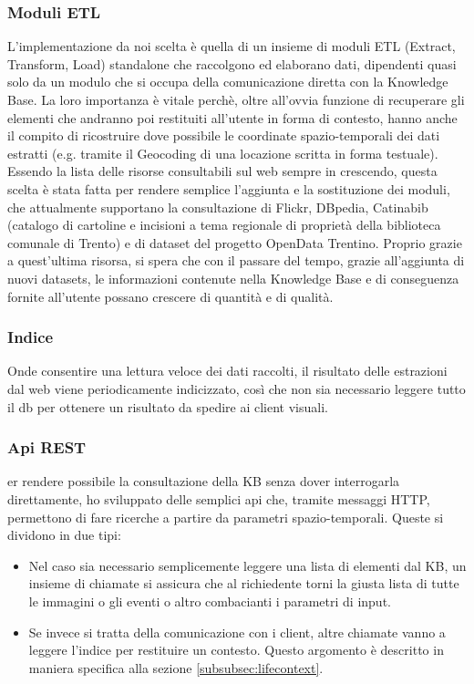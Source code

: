 \documentclass[sigproc-sp.tex]{subfiles}
\begin{document}
\subsubsection{Moduli ETL}
L’implementazione da noi scelta è quella di un insieme di moduli ETL (Extract, Transform, Load) standalone che raccolgono ed elaborano dati, dipendenti quasi solo da un modulo che si occupa della comunicazione diretta con la Knowledge Base. La loro importanza è vitale perchè, oltre all’ovvia funzione di recuperare gli elementi che andranno poi restituiti all’utente in forma di contesto, hanno anche il compito di ricostruire dove possibile le coordinate spazio-temporali dei dati estratti (e.g. tramite il Geocoding di una locazione scritta in forma testuale). Essendo la lista delle risorse consultabili sul web sempre in crescendo, questa scelta è stata fatta per rendere semplice l’aggiunta e la sostituzione dei moduli, che attualmente supportano la consultazione di Flickr, DBpedia, Catinabib (catalogo di cartoline e incisioni a tema regionale di proprietà della biblioteca comunale di Trento) e di dataset del progetto OpenData Trentino. Proprio grazie a quest’ultima risorsa, si spera che con il passare del tempo, grazie all’aggiunta di nuovi datasets, le informazioni contenute nella Knowledge Base e di conseguenza fornite all’utente possano crescere di quantità e di qualità.

\subsubsection{Indice}
Onde consentire una lettura veloce dei dati raccolti, il risultato delle estrazioni dal web viene periodicamente indicizzato, così che non sia necessario leggere tutto il db per ottenere un risultato da spedire ai client visuali.

\subsubsection{Api REST}
er rendere possibile la consultazione della KB senza dover interrogarla direttamente, ho sviluppato delle semplici api che, tramite messaggi HTTP, permettono di fare ricerche a partire da parametri spazio-temporali. Queste si dividono in due tipi:
\begin{itemize}
\item Nel caso sia necessario semplicemente leggere una lista di elementi dal KB, un insieme di chiamate si assicura che al richiedente torni la giusta lista di tutte le immagini o gli eventi o altro combacianti i parametri di input.
\item Se invece si tratta della comunicazione con i client, altre chiamate vanno a leggere l’indice per restituire un contesto. Questo argomento è descritto in maniera specifica alla sezione \ref{subsubsec:lifecontext}.
\end{itemize}
\end{document}
